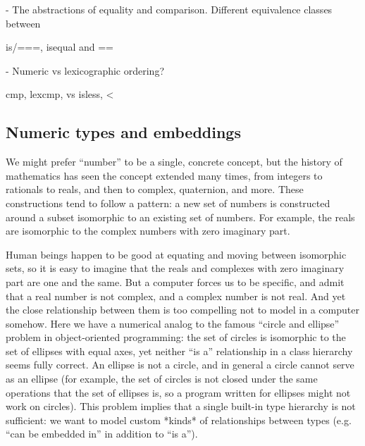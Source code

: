 - The abstractions of equality and comparison. Different equivalence classes between

is/===, isequal and ==

- Numeric vs lexicographic ordering?

cmp, lexcmp, vs isless, <

\subsection{Numeric types and embeddings}

We might prefer ``number'' to be a single,
concrete concept, but the history of mathematics has seen the concept
extended many times, from integers to rationals to reals, and then to complex,
quaternion, and more. These constructions tend to follow a pattern: a new set
of numbers is constructed around a subset isomorphic to an existing set of
numbers. For example, the reals are isomorphic to the complex numbers with
zero imaginary part.

Human beings happen to be good at equating and moving between isomorphic sets,
so it is easy to imagine that the reals and complexes with zero imaginary
part are one and the same. But a computer forces us to be specific, and admit
that a real number is not complex, and a complex number is not real. And yet
the close relationship between them is too compelling not to model in a
computer somehow. Here we have a numerical analog to the famous ``circle and
ellipse'' problem in object-oriented programming: the set of circles is
isomorphic to the set of ellipses with equal axes, yet neither ``is a''
relationship in a class hierarchy seems fully correct. An ellipse is not
a circle, and in general a circle cannot serve as an ellipse (for example,
the set of circles is not closed under the same operations that the set of
ellipses is, so a program written for ellipses might not work on circles).
This problem implies that a single built-in type hierarchy is not
sufficient: we want to model custom *kinds* of relationships between
types (e.g. ``can be embedded in'' in addition to ``is a'').


